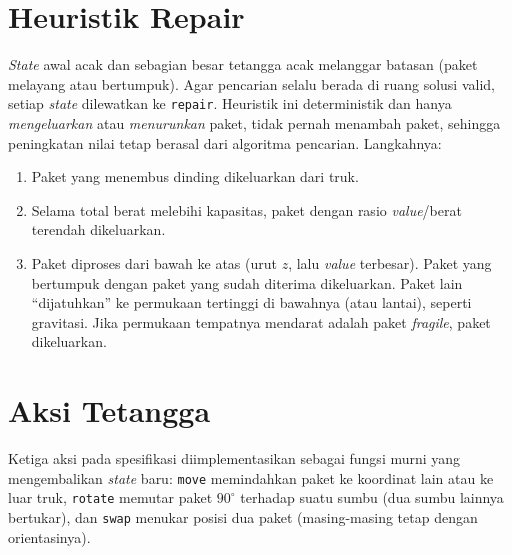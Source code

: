 

\section{Heuristik Repair}
\label{sec:repair}

\textit{State} awal acak dan sebagian besar tetangga acak melanggar batasan
(paket melayang atau bertumpuk). Agar pencarian selalu berada di ruang solusi valid,
setiap \textit{state} dilewatkan ke \texttt{repair}. Heuristik ini deterministik dan
hanya \emph{mengeluarkan} atau \emph{menurunkan} paket, tidak pernah menambah paket,
sehingga peningkatan nilai tetap berasal dari algoritma pencarian. Langkahnya:
\begin{enumerate}
	\item Paket yang menembus dinding dikeluarkan dari truk.
	\item Selama total berat melebihi kapasitas, paket dengan rasio
	\textit{value}/berat terendah dikeluarkan.
	\item Paket diproses dari bawah ke atas (urut $z$, lalu \textit{value} terbesar).
	Paket yang bertumpuk dengan paket yang sudah diterima dikeluarkan. Paket lain
	``dijatuhkan'' ke permukaan tertinggi di bawahnya (atau lantai), seperti gravitasi.
	Jika permukaan tempatnya mendarat adalah paket \textit{fragile}, paket dikeluarkan.
\end{enumerate}



\section{Aksi Tetangga}

Ketiga aksi pada spesifikasi diimplementasikan sebagai fungsi murni yang
mengembalikan \textit{state} baru:
\texttt{move} memindahkan paket ke koordinat lain atau ke luar truk,
\texttt{rotate} memutar paket $90^\circ$ terhadap suatu sumbu (dua sumbu lainnya
bertukar), dan \texttt{swap} menukar posisi dua paket (masing-masing tetap dengan
orientasinya).



